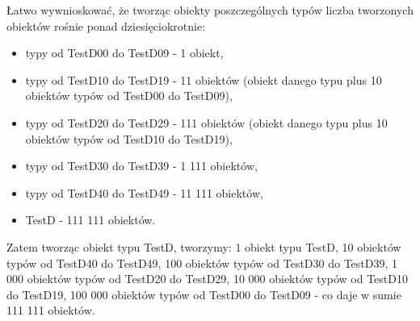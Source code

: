 \documentclass[12pt]{article}
\begin{document}
Łatwo wywnioskować, że tworząc obiekty poszczególnych typów liczba tworzonych obiektów rośnie ponad dziesięciokrotnie:
\begin{itemize}
	\item typy od TestD00 do TestD09 - 1 obiekt,
	\item typy od TestD10 do TestD19 - 11 obiektów (obiekt danego typu plus 10 obiektów typów od TestD00 do TestD09),
	\item typy od TestD20 do TestD29 - 111 obiektów (obiekt danego typu plus 10 obiektów typów od TestD10 do TestD19),
	\item typy od TestD30 do TestD39 - 1 111 obiektów,
	\item  typy od TestD40 do TestD49 - 11 111 obiektów,
	\item TestD - 111 111 obiektów.
\end{itemize}
Zatem tworząc obiekt typu TestD, tworzymy: 1 obiekt typu TestD, 10 obiektów typów od TestD40 do TestD49, 100 obiektów typów od TestD30 do TestD39, 1 000 obiektów typów od TestD20 do TestD29, 10 000 obiektów typów od TestD10 do TestD19, 100 000 obiektów typów od TestD00 do TestD09 - co daje w sumie 111 111 obiektów.
\end{document}
